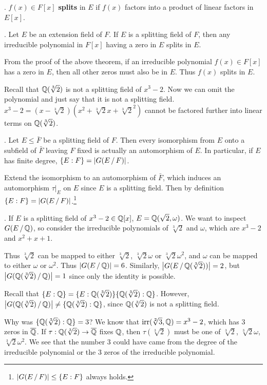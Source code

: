 . \(f(x) \in F[x]\) \textbf{splits} in \(E\) if \(f(x)\) factors into a product of linear factors in \(E[x]\).

\cor. Let \(E\) be an extension field of \(F\). If \(E\) is a splitting field of \(F\), then any irreducible polynomial in \(F[x]\) having a zero in \(E\) splits in \(E\).

\pf From the proof of the above theorem, if an irreducible polynomial \(f(x) \in F[x]\) has a zero in \(E\), then all other zeros must also be in \(E\). Thus \(f(x)\) splits in \(E\).

Recall that \(\mathbb{Q}(\sqrt[3]{2})\) is not a splitting field of \(x^3-2\). Now we can omit the polynomial and just say that it is not a splitting field. \(x^3 - 2 = (x - \sqrt[3]{2})(x^2 + \sqrt[3]{2}x + \sqrt[3]{2}^2)\) cannot be factored further into linear terms on \(\mathbb{Q}(\sqrt[3]{2})\).

\cor. Let \(E \leq \bar{F}\) be a splitting field of \(F\). Then every isomorphism from \(E\) onto a subfield of \(\bar{F}\) leaving \(F\) fixed is actually an automorphism of \(E\). In particular, if \(E\) has finite degree, \(\{E : F\} = \left| G(E \operatorname{/} F) \right|\).

\pf Extend the isomorphism to an automorphism of \(\bar{F}\), which induces an automorphism \(\tau|_E\) on \(E\) since \(E\) is a splitting field. Then by definition \(\{E : F\} = \left| G(E \operatorname{/} F) \right|\).\footnote{\(\left| G(E\operatorname{/} F) \right| \leq \{E : F\}\) always holds.}

\ex. If \(E\) is a splitting field of \(x^3 - 2 \in \mathbb{Q}[x]\), \(E = \mathbb{Q}(\sqrt{2}, \omega)\). We want to inspect \(G(E \operatorname{/} \mathbb{Q})\), so consider the irreducible polynomials of \(\sqrt[3]{2}\) and \(\omega\), which are \(x^3 - 2\) and \(x^2 + x + 1\).

Thus \(\sqrt[3]{2}\) can be mapped to either \(\sqrt[3]{2}\), \(\sqrt[3]{2}\omega\) or \(\sqrt[3]{2}\omega^2\), and \(\omega\) can be mapped to either \(\omega\) or \(\omega^2\). Thus \(\left| G(E \operatorname{/} \mathbb{Q}) \right| = 6\). Similarly, \(\left| G(E \operatorname{/} \mathbb{Q}(\sqrt[3]{2})) \right| = 2\), but \(\left| G(\mathbb{Q}(\sqrt[3]{2}) \operatorname{/} \mathbb{Q}) \right| = 1\) since only the identity is possible.

Recall that \(\{E : \mathbb{Q}\} = \{E : \mathbb{Q}(\sqrt[3]{2})\} \{\mathbb{Q}(\sqrt[3]{2}) : \mathbb{Q}\}\). However, \(\left| G(\mathbb{Q}(\sqrt[3]{2}) \operatorname{/} \mathbb{Q}) \right| \neq \{\mathbb{Q}(\sqrt[3]{2}) : \mathbb{Q}\}\), since \(\mathbb{Q}(\sqrt[3]{2})\) is not a splitting field.

\rmk Why was \(\{\mathbb{Q}(\sqrt[3]{2}) : \mathbb{Q}\} = 3\)? We know that \(\mathrm{irr}(\sqrt[2]{3}, \mathbb{Q}) = x^3 - 2\), which has \(3\) zeros in \(\bar{\Q}\). If \(\tau : \Q(\sqrt[3]{2}) \ra \bar{\Q}\) fixes \(\mathbb{Q}\), then \(\tau(\sqrt[3]{2})\) must be one of \(\sqrt[3]{2}\), \(\sqrt[3]{2}\omega\), \(\sqrt[3]{2}\omega^2\). We see that the number \(3\) could have came from the degree of the irreducible polynomial or the \(3\) zeros of the irreducible polynomial.

